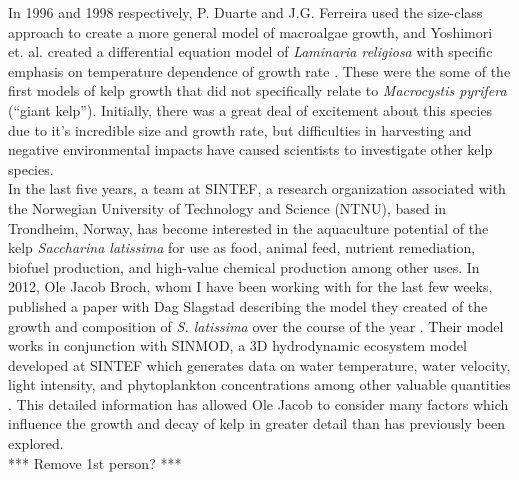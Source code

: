 In 1996 and 1998 respectively, P. Duarte and J.G. Ferreira used the size-class approach to create a more general model of macroalgae growth, and Yoshimori et. al. created a differential equation model of \textit{Laminaria religiosa} with specific emphasis on temperature dependence of growth rate \cite{duarte_model_1997,yoshimori_mathematical_1998}.
These were the some of the first models of kelp growth that did not specifically relate to \textit{Macrocystis pyrifera} (``giant kelp''). 
Initially, there was a great deal of excitement about this species due to it's incredible size and growth rate, but difficulties in harvesting and negative environmental impacts have caused scientists to investigate other kelp species. \\[-0.75em]

In the last five years, a team at SINTEF, a research organization associated with the Norwegian University of Technology and Science (NTNU), based in Trondheim, Norway, has become interested in the aquaculture potential of the kelp \textit{Saccharina latissima} for use as food, animal feed, nutrient remediation, biofuel production, and high-value chemical production among other uses. 
In 2012, Ole Jacob Broch, whom I have been working with for the last few weeks, published a paper with Dag Slagstad describing the model they created of the growth and composition of \textit{S. latissima} over the course of the year \cite{broch_modelling_2012}.
Their model works in conjunction with SINMOD, a 3D hydrodynamic ecosystem model developed at SINTEF which generates data on water temperature, water velocity, light intensity, and phytoplankton concentrations among other valuable quantities \cite{wassmann_modelling_2006}.
This detailed information has allowed Ole Jacob to consider many factors which influence the growth and decay of kelp in greater detail than has previously been explored. \\[-0.75em]
*** Remove 1st person? ***

